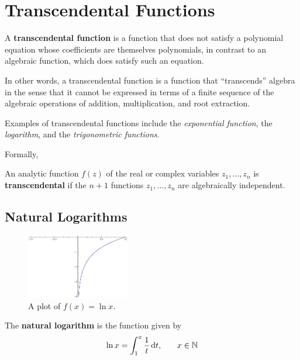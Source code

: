 \chapter{Transcendental Functions}

\begin{defn}
  A \textbf{transcendental function} is a function that does not satisfy a polynomial equation whose coefficients are themselves polynomials, in contrast to an algebraic function, which does satisfy such an equation.
\end{defn}

In other words, a transcendental function is a function that ``transcends'' algebra in the sense that it cannot be expressed in terms of a finite sequence of the algebraic operations of addition, multiplication, and root extraction.

Examples of transcendental functions include the \emph{exponential function}, the \emph{logarithm}, and the \emph{trigonometric functions}.

Formally,

\begin{defn}
  An analytic function \(f(z)\) of the real or complex variables \(z_1, \ldots, z_n\) is \textbf{transcendental} if the \(n+1\) functions \(z_1, \ldots, z_n\) are algebraically independent.
  \cite{wiki:transcendental}
\end{defn}

\section{Natural Logarithms}
\begin{figure}[h]
  \begin{center}
    \includegraphics[width=0.4\textwidth]{continuous/transcend/natlog.eps}
  \end{center}
  \caption{A plot of $f(x) =\ln x$.}
  \label{fig:natlog}
\end{figure}

\begin{defn}
  The \textbf{natural logarithm} is the function given by
  \begin{equation}
    \ln x = \int ^{x} _{1} \frac{1}{t} \,\mathrm{d} t \text{,} \qquad x \in \mathbb{N}
  \end{equation}
\end{defn}

